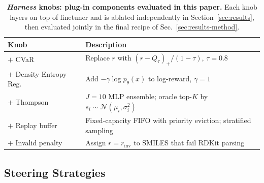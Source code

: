 \begin{table}[h]
\centering
\small
    \begin{tabular}{@{}p{4.4cm}p{9.3cm}@{}}
\toprule
\textbf{Knob} & \textbf{Description} \\
\midrule
$+$ CVaR~\citep{santiFlowDensityControl, wang2026efficient}            & Replace $r$ with $(r - Q_\tau)_+/(1-\tau)$, $\tau{=}0.8$ \\
$+$ Density Entropy Reg.~\citep{de2025provable}  & Add $-\gamma \log p_\theta(x)$ to log-reward, $\gamma{=}1$ \\
$+$ Thompson~\citep{thompson1933likelihood, chapelle2011empirical}        & $J{=}10$ MLP ensemble; oracle top-$K$ by $s_i \sim \mathcal{N}(\mu_i, \sigma_i^2)$ \\
$+$ Replay buffer~\citep{mnih2015human}   & Fixed-capacity FIFO with priority eviction; stratified sampling \\
$+$ Invalid penalty~\citep{wangFineTuningDiscreteDiffusion2024, ueharaELEGANT2024}  & Assign $r {=} r_{\text{inv}}$ to SMILES that fail RDKit parsing \\
\bottomrule
\end{tabular}
\caption{\textbf{\emph{Harness} knobs: plug-in components evaluated in this paper.} Each knob layers on top of finetuner and is ablated independently in Section~\ref{sec:results}, then evaluated jointly in the final recipe of Sec.~\ref{sec:results-method}.}
\label{tab:methods}
\vspace{-0.2in}
\end{table}



\subsection{Steering Strategies}\label{sec:design-explore}

